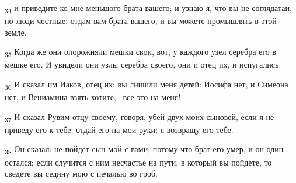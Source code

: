 \begin{tcolorbox}
\textsubscript{34} и приведите ко мне меньшого брата вашего; и узнаю я, что вы не соглядатаи, но люди честные; отдам вам брата вашего, и вы можете промышлять в этой земле.
\end{tcolorbox}
\begin{tcolorbox}
\textsubscript{35} Когда же они опорожняли мешки свои, вот, у каждого узел серебра его в мешке его. И увидели они узлы серебра своего, они и отец их, и испугались.
\end{tcolorbox}
\begin{tcolorbox}
\textsubscript{36} И сказал им Иаков, отец их: вы лишили меня детей: Иосифа нет, и Симеона нет, и Вениамина взять хотите, --все это на меня!
\end{tcolorbox}
\begin{tcolorbox}
\textsubscript{37} И сказал Рувим отцу своему, говоря: убей двух моих сыновей, если я не приведу его к тебе; отдай его на мои руки; я возвращу его тебе.
\end{tcolorbox}
\begin{tcolorbox}
\textsubscript{38} Он сказал: не пойдет сын мой с вами; потому что брат его умер, и он один остался; если случится с ним несчастье на пути, в который вы пойдете, то сведете вы седину мою с печалью во гроб.
\end{tcolorbox}
